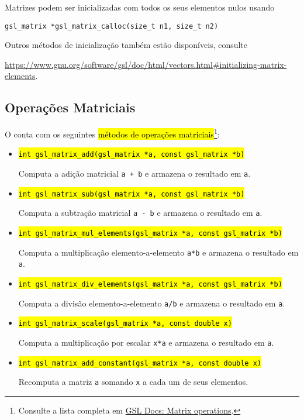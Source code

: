\documentclass[12pt]{article}
\begin{document}
\begin{obs}
  Matrizes podem ser inicializadas com todos os seus elementos nulos usando
\begin{lstlisting}
gsl_matrix *gsl_matrix_calloc(size_t n1, size_t n2)
\end{lstlisting}
  Outros métodos de inicialização também estão disponíveis, consulte
  \begin{center}
    \url{https://www.gnu.org/software/gsl/doc/html/vectors.html#initializing-matrix-elements}.
  \end{center}
\end{obs}

\subsection{Operações Matriciais}

O {\gsl} conta com os seguintes \hl{métodos de operações matriciais}\footnote{Consulte a lista completa em \href{https://www.gnu.org/software/gsl/doc/html/vectors.html\#matrix-operations}{GSL Docs: Matrix operations}.}:
\begin{itemize}
\item \hl{\texttt{int gsl\_matrix\_add(gsl\_matrix *a, const gsl\_matrix *b)}}

  Computa a adição matricial \lstinline!a + b! e armazena o resultado em \lstinline!a!.

\item \hl{\texttt{int gsl\_matrix\_sub(gsl\_matrix *a, const gsl\_matrix *b)}}

  Computa a subtração matricial \lstinline!a - b! e armazena o resultado em \lstinline!a!.

\item \hl{\texttt{int gsl\_matrix\_mul\_elements(gsl\_matrix *a, const gsl\_matrix *b)}}

  Computa a multiplicação elemento-a-elemento \lstinline!a*b! e armazena o resultado em \lstinline!a!.

\item \hl{\texttt{int gsl\_matrix\_div\_elements(gsl\_matrix *a, const gsl\_matrix *b)}}

  Computa a divisão elemento-a-elemento \lstinline!a/b! e armazena o resultado em \lstinline!a!.

\item \hl{\texttt{int gsl\_matrix\_scale(gsl\_matrix *a, const double x)}}

  Computa a multiplicação por escalar \lstinline!x*a! e armazena o resultado em \lstinline!a!.

\item \hl{\texttt{int gsl\_matrix\_add\_constant(gsl\_matrix *a, const double x)}}

  Recomputa a matriz \lstinline+a+ somando \lstinline+x+ a cada um de seus elementos.
\end{itemize}
\end{document}
